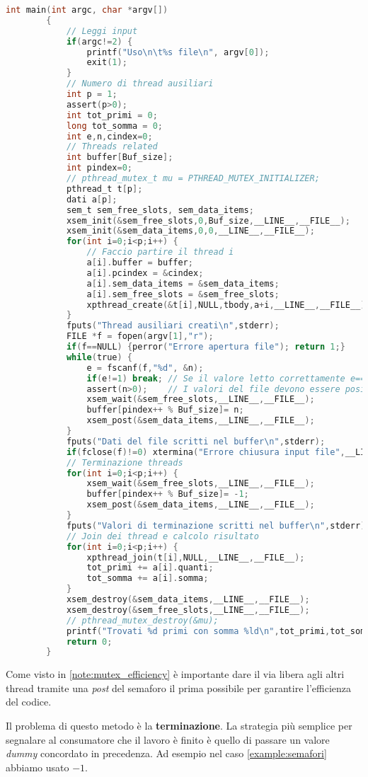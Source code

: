 \begin{example}
\begin{lstlisting}[language=C]
		int main(int argc, char *argv[])
		{
			// Leggi input
			if(argc!=2) {
				printf("Uso\n\t%s file\n", argv[0]);
				exit(1);
			}
			// Numero di thread ausiliari 
			int p = 1;
			assert(p>0);
			int tot_primi = 0;
			long tot_somma = 0;
			int e,n,cindex=0;    
			// Threads related
			int buffer[Buf_size];
			int pindex=0;
			// pthread_mutex_t mu = PTHREAD_MUTEX_INITIALIZER;
			pthread_t t[p];
			dati a[p];
			sem_t sem_free_slots, sem_data_items;
			xsem_init(&sem_free_slots,0,Buf_size,__LINE__,__FILE__);
			xsem_init(&sem_data_items,0,0,__LINE__,__FILE__);
			for(int i=0;i<p;i++) {
				// Faccio partire il thread i
				a[i].buffer = buffer;
				a[i].pcindex = &cindex;
				a[i].sem_data_items = &sem_data_items;
				a[i].sem_free_slots = &sem_free_slots;
				xpthread_create(&t[i],NULL,tbody,a+i,__LINE__,__FILE__);
			}
			fputs("Thread ausiliari creati\n",stderr);
			FILE *f = fopen(argv[1],"r");
			if(f==NULL) {perror("Errore apertura file"); return 1;}
			while(true) {
				e = fscanf(f,"%d", &n);
				if(e!=1) break; // Se il valore letto correttamente e==1
				assert(n>0);    // I valori del file devono essere positivi
				xsem_wait(&sem_free_slots,__LINE__,__FILE__);
				buffer[pindex++ % Buf_size]= n;
				xsem_post(&sem_data_items,__LINE__,__FILE__);
			}
			fputs("Dati del file scritti nel buffer\n",stderr);
			if(fclose(f)!=0) xtermina("Errore chiusura input file",__LINE__,__FILE__);
			// Terminazione threads
			for(int i=0;i<p;i++) {
				xsem_wait(&sem_free_slots,__LINE__,__FILE__);
				buffer[pindex++ % Buf_size]= -1;
				xsem_post(&sem_data_items,__LINE__,__FILE__);
			}
			fputs("Valori di terminazione scritti nel buffer\n",stderr);
			// Join dei thread e calcolo risultato
			for(int i=0;i<p;i++) {
				xpthread_join(t[i],NULL,__LINE__,__FILE__);
				tot_primi += a[i].quanti;
				tot_somma += a[i].somma;
			}
			xsem_destroy(&sem_data_items,__LINE__,__FILE__);
			xsem_destroy(&sem_free_slots,__LINE__,__FILE__);
			// pthread_mutex_destroy(&mu);
			printf("Trovati %d primi con somma %ld\n",tot_primi,tot_somma);
			return 0;
		}
	\end{lstlisting}
\end{example}
\begin{note}
	Come visto in \ref{note:mutex_efficiency} è importante dare il via libera agli altri thread tramite una \emph{post} del semaforo il prima possibile per garantire l'efficienza del codice.
\end{note}
Il problema di questo metodo è la \textbf{terminazione}. La strategia più semplice per segnalare al consumatore che il lavoro è finito è quello di passare un valore \emph{dummy} concordato in precedenza. Ad esempio nel caso \ref{example:semafori} abbiamo usato $-1$.

